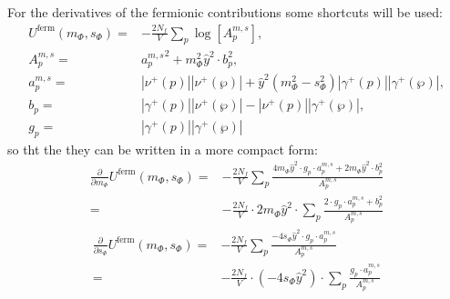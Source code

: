 For the derivatives of the fermionic contributions some shortcuts will be used:
\begin{align}\label{eq:CEP_ferionicContribution_shortcuts}
 U^{\text{ferm}}(m_{\Phi}, s_{\Phi}) =& -\frac{2N_f}{V} \sum\limits_p \log\left[{A_p^{m, s}}\right],
                    \\ \label{eq:CEP_ferionicContribution_shortcuts_A}
 {A_p^{m, s}} =& {a_p^{m,s}}^2 +  m_{\Phi}^2 \hat y^2 \cdot b_p^2 ,
                    \\ \label{eq:CEP_ferionicContribution_shortcuts_a}
 {a_p^{m,s}} =& |\nu^+(p)| |\nu^+(\wp)|   +   \hat y ^2 \left( m_{\Phi}^2 - s_{\Phi}^2 \right) |\gamma^+(p)| |\gamma^+(\wp)|,
                    \\ \label{eq:CEP_ferionicContribution_shortcuts_b}
 b_p                     =& |\gamma^+(p)| |\nu^+(\wp)|   -   |\nu^+(p)| |\gamma^+(\wp)|, 
                    \\ \label{eq:CEP_ferionicContribution_shortcuts_g}
 g_p                     =&  |\gamma^+(p)| |\gamma^+(\wp)|
\end{align}
so tht the they can be written in a more compact form:
\begin{align}\label{eq:CEP_derivative_dm_fermionicContribution}
 \frac{\partial }{\partial m_{\Phi}} U^{\text{ferm}}(m_{\Phi}, s_{\Phi}) =& -\frac{2N_f}{V} \sum\limits_p
                   \frac{4 m_{\Phi} \hat y^2 \cdot g_p \cdot {a_p^{m,s}}   +   2 m_{\Phi} \hat y^2 \cdot b_p^2}
                   { {A_p^{m, s}} } 
       \nonumber \\
%                    
            =& -\frac{2N_f}{V} \cdot 2 m_{\Phi} \hat y^2 \cdot \sum\limits_p 
                   \frac{2 \cdot g_p \cdot {a_p^{m,s}} + b_p^2}{ {A_p^{m, s}} }
\end{align} 
\begin{align}\label{eq:CEP_derivative_ds_fermionicContribution}
 \frac{\partial }{\partial s_{\Phi}} U^{\text{ferm}}(m_{\Phi}, s_{\Phi}) =& -\frac{2N_f}{V} \sum\limits_p
                   \frac{- 4 s_{\Phi} \hat y^2 \cdot g_p \cdot {a_p^{m,s}} }
                   { {A_p^{m, s}} } 
       \nonumber \\
%                    
            =& -\frac{2N_f}{V} \cdot \left( -4 s_{\Phi} \hat y^2\right) \cdot \sum\limits_p 
                   \frac{ g_p \cdot {a_p^{m,s}} }{ {A_p^{m, s}} }
\end{align} 

